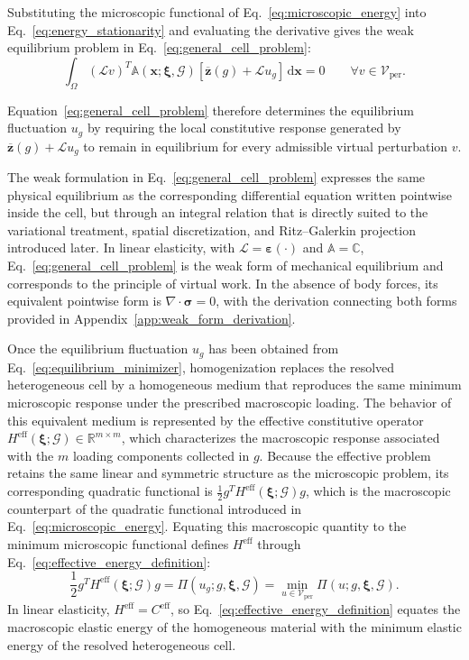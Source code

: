 \documentclass[pdflatex,sn-basic,Numbered]{sn-jnl}
\newcommand{\R}{\mathbb{R}}
\newcommand{\G}{\mathcal{G}}
\newcommand{\Heff}{H^{\mathrm{eff}}}
\begin{document}
Substituting the microscopic functional of
Eq.~\eqref{eq:microscopic_energy} into
Eq.~\eqref{eq:energy_stationarity} and evaluating the derivative gives the
weak equilibrium problem in Eq.~\eqref{eq:general_cell_problem}:
\begin{equation}
\label{eq:general_cell_problem}
\int_{\Omega}
(\mathcal L v)^T
\mathbb A(\boldsymbol x;\boldsymbol\xi,\G)
\left[
\overline{\boldsymbol z}(g)
+
\mathcal L u_g
\right]
\,\mathrm{d}\boldsymbol x
=
0
\qquad
\forall v\in\mathcal V_{\mathrm{per}}.
\end{equation}

Equation~\eqref{eq:general_cell_problem} therefore determines the equilibrium
fluctuation \(u_g\) by requiring the local constitutive response generated by
\(\overline{\boldsymbol z}(g)+\mathcal L u_g\) to remain in equilibrium for
every admissible virtual perturbation \(v\).

The weak formulation in Eq.~\eqref{eq:general_cell_problem} expresses the
same physical equilibrium as the corresponding differential equation written
pointwise inside the cell, but through an integral relation that is directly
suited to the variational treatment, spatial discretization, and
Ritz--Galerkin projection introduced later. In linear elasticity, with
\(\mathcal L=\boldsymbol{\varepsilon}(\cdot)\) and
\(\mathbb A=\mathbb C\), Eq.~\eqref{eq:general_cell_problem} is the weak form
of mechanical equilibrium and corresponds to the principle of virtual work.
In the absence of body forces, its equivalent pointwise form is
\(\nabla\!\cdot\!\boldsymbol{\sigma}=0\), with the derivation connecting both
forms provided in Appendix~\ref{app:weak_form_derivation}.

Once the equilibrium fluctuation \(u_g\) has been obtained from
Eq.~\eqref{eq:equilibrium_minimizer}, homogenization replaces the resolved
heterogeneous cell by a homogeneous medium that reproduces the same minimum
microscopic response under the prescribed macroscopic loading. The behavior
of this equivalent medium is represented by the effective constitutive
operator
\(\Heff(\boldsymbol\xi;\G)\in\R^{m\times m}\), which characterizes the
macroscopic response associated with the \(m\) loading components collected
in \(g\). Because the effective problem retains the same linear and symmetric
structure as the microscopic problem, its corresponding quadratic functional
is \(\frac{1}{2}g^T\Heff(\boldsymbol\xi;\G)g\), which is the macroscopic
counterpart of the quadratic functional introduced in
Eq.~\eqref{eq:microscopic_energy}. Equating this macroscopic quantity to the
minimum microscopic functional defines \(\Heff\) through
Eq.~\eqref{eq:effective_energy_definition}:
\begin{equation}
\label{eq:effective_energy_definition}
\frac{1}{2}
g^T\Heff(\boldsymbol\xi;\G)g
=
\Pi(u_g;g,\boldsymbol\xi,\G)
=
\min_{u\in\mathcal V_{\mathrm{per}}}
\Pi(u;g,\boldsymbol\xi,\G).
\end{equation}
In linear elasticity, \(\Heff=C^{\mathrm{eff}}\), so
Eq.~\eqref{eq:effective_energy_definition} equates the macroscopic elastic
energy of the homogeneous material with the minimum elastic energy of the
resolved heterogeneous cell.
\end{document}

